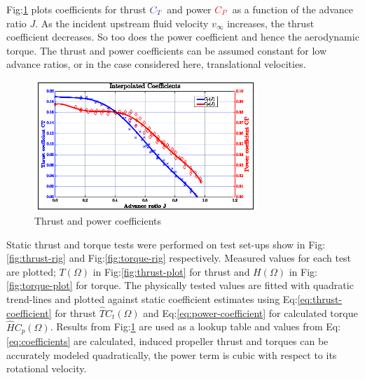 Fig:\ref{fig:coeffs-plot} plots coefficients for thrust {$\color{Blue}C_{T}$} and power {$\color{Red}C_{P}$} as a function of the advance ratio $J$. As the incident upstream fluid velocity $v_\infty$ increases, the thrust coefficient decreases. So too does the power coefficient and hence the aerodynamic torque. The thrust and power coefficients can be assumed constant for low advance ratios, or in the case considered here, translational velocities.
\begin{figure}[htpb]
\centering
\includegraphics[width=0.75\textwidth]{graphs/coeffs-plot}
\vspace{-4pt}
\caption{Thrust and power coefficients}
\vspace{-18pt}
\label{fig:coeffs-plot}
\end{figure}
\par
Static thrust and torque tests were performed on test set-ups show in Fig:\ref{fig:thrust-rig} and Fig:\ref{fig:torque-rig} respectively. Measured values for each test are plotted; {\color{Red}$T(\Omega)$} in Fig:\ref{fig:thrust-plot} for thrust and {\color{Red}$H(\Omega)$} in Fig:\ref{fig:torque-plot} for torque. The physically tested values are fitted with quadratic trend-lines and plotted against static coefficient estimates using Eq:\ref{eq:thrust-coefficient} for thrust {\color{LimeGreen}$\hat{T}C_t(\Omega)$} and Eq:\ref{eq:power-coefficient} for calculated torque {\color{LimeGreen}$\hat{H}C_p(\Omega)$}. Results from Fig:\ref{fig:coeffs-plot} are used as a lookup table and values from Eq:\ref{eq:coefficients} are calculated, induced propeller thrust and torques can be accurately modeled quadratically, the power term is cubic with respect to its rotational velocity. 
